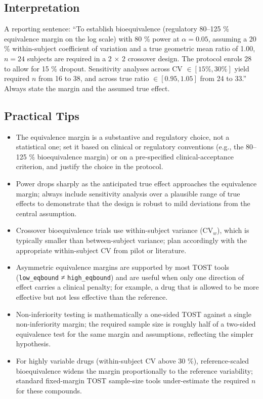 \documentclass[
]{article}
\providecommand{\tightlist}{%
  \setlength{\itemsep}{0pt}\setlength{\parskip}{0pt}}
\begin{document}
\subsection{Interpretation}\label{interpretation}

A reporting sentence: ``To establish bioequivalence (regulatory 80--125
\% equivalence margin on the log scale) with 80 \% power at
\(\alpha = 0.05\), assuming a 20 \% within-subject coefficient of
variation and a true geometric mean ratio of 1.00, \(n = 24\) subjects
are required in a 2 × 2 crossover design. The protocol enrols 28 to
allow for 15 \% dropout. Sensitivity analyses across CV
\(\in [15 \%, 30 \%]\) yield required \(n\) from 16 to 38, and across
true ratio \(\in [0.95, 1.05]\) from 24 to 33.'' Always state the margin
and the assumed true effect.

\subsection{Practical Tips}\label{practical-tips}

\begin{itemize}
\tightlist
\item
  The equivalence margin is a substantive and regulatory choice, not a
  statistical one; set it based on clinical or regulatory conventions
  (e.g., the 80--125 \% bioequivalence margin) or on a pre-specified
  clinical-acceptance criterion, and justify the choice in the protocol.
\item
  Power drops sharply as the anticipated true effect approaches the
  equivalence margin; always include sensitivity analysis over a
  plausible range of true effects to demonstrate that the design is
  robust to mild deviations from the central assumption.
\item
  Crossover bioequivalence trials use within-subject variance
  (\(\mathrm{CV}_w\)), which is typically smaller than between-subject
  variance; plan accordingly with the appropriate within-subject CV from
  pilot or literature.
\item
  Asymmetric equivalence margins are supported by most TOST tools
  (\texttt{low\_eqbound} ≠ \texttt{high\_eqbound}) and are useful when
  only one direction of effect carries a clinical penalty; for example,
  a drug that is allowed to be more effective but not less effective
  than the reference.
\item
  Non-inferiority testing is mathematically a one-sided TOST against a
  single non-inferiority margin; the required sample size is roughly
  half of a two-sided equivalence test for the same margin and
  assumptions, reflecting the simpler hypothesis.
\item
  For highly variable drugs (within-subject CV above 30 \%),
  reference-scaled bioequivalence widens the margin proportionally to
  the reference variability; standard fixed-margin TOST sample-size
  tools under-estimate the required \(n\) for these compounds.
\end{itemize}
\end{document}

